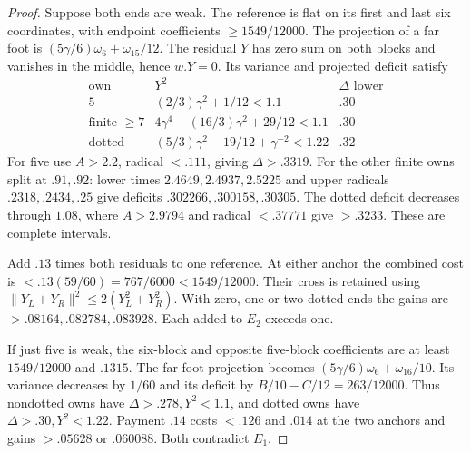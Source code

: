 \documentclass[11pt]{article}
\theoremstyle{definition}
\theoremstyle{remark}
\newcommand{\norm}[1]{\lVert #1\rVert}
\begin{document}
\begin{proof}
Suppose both ends are weak. The reference is flat on its first
and last six coordinates, with endpoint coefficients
$\ge1549/12000$. The projection of a far foot is
$(5\gamma/6)\omega_6+\omega_{15}/12$.
The residual $Y$ has zero sum on both blocks and vanishes in the
middle, hence $w.Y=0$. Its variance and projected deficit satisfy
\[
\begin{array}{c|c|c}
\text{own}&Y^2&\Delta\text{ lower}\\\hline
5&(2/3)\gamma^2+1/12<1.1&.30\\
\text{finite }\ge7&4\gamma^4-(16/3)\gamma^2+29/12<1.1&.30\\
\text{dotted}&(5/3)\gamma^2-19/12+\gamma^{-2}<1.22&.32
\end{array}
\]
For five use $A>2.2$, radical $<.111$, giving $\Delta>.3319$.
For the other finite owns split at $.91,\allowbreak .92$: lower times
$2.4649,\allowbreak 2.4937,\allowbreak 2.5225$ and upper radicals $.2318,\allowbreak .2434,\allowbreak .25$
give deficits $.302266,\allowbreak .300158,\allowbreak .30305$.
The dotted deficit decreases through $1.08$, where $A>2.9794$
and radical $<.37771$ give $>.3233$. These are complete intervals.

Add $.13$ times both residuals to one reference. At either anchor
the combined cost is $<.13(59/60)=767/6000<1549/12000$.
Their cross is retained using
$\norm{Y_L+Y_R}^2\le2(Y_L^2+Y_R^2)$.
With zero, one or two dotted ends the gains are
$>.08164,.082784,.083928$. Each added to $E_2$ exceeds one.

If just five is weak, the six-block and opposite five-block
coefficients are at least $1549/12000$ and $.1315$.
The far-foot projection becomes
$(5\gamma/6)\omega_6+\omega_{16}/10$.
Its variance decreases by $1/60$ and its deficit by
$B/10-C/12=263/12000$. Thus nondotted owns have
$\Delta>.278,Y^2<1.1$, and dotted owns have
$\Delta>.30,Y^2<1.22$. Payment $.14$ costs $<.126$ and
$.014$ at the two anchors and gains $>.05628$ or $.060088$.
Both contradict $E_1$.


\end{proof}
\end{document}
